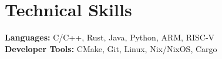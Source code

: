 \documentclass[letterpaper,11pt]{article}
\begin{document}
%
\section{Technical Skills}
 \begin{itemize}[leftmargin=0.15in, label={}]
    \small{\item{
     \textbf{Languages:} C/C++, Rust, Java, Python, ARM, RISC-V \\
     \textbf{Developer Tools:} CMake, Git, Linux, Nix/NixOS, Cargo \\
    }}
 \end{itemize}


\end{document}
